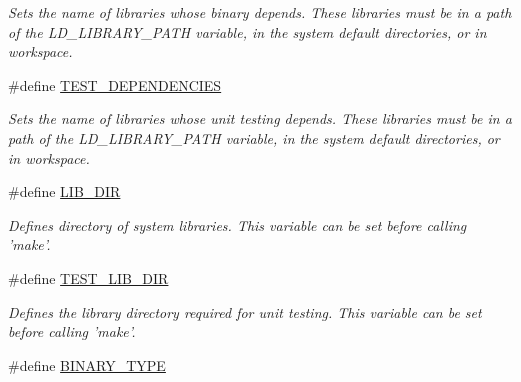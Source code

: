 \begin{DoxyCompactItemize}
\begin{DoxyCompactList}\small\item\em Sets the name of libraries whose binary depends. These libraries must be in a path of the L\+D\+\_\+\+L\+I\+B\+R\+A\+R\+Y\+\_\+\+P\+A\+T\+H variable, in the system default directories, or in workspace. \end{DoxyCompactList}\item 
\hypertarget{group___project___variables_ga36eaa1244b8f912226a6211c0300afd1}{\#define \hyperlink{group___project___variables_ga36eaa1244b8f912226a6211c0300afd1}{T\+E\+S\+T\+\_\+\+D\+E\+P\+E\+N\+D\+E\+N\+C\+I\+E\+S}}\label{group___project___variables_ga36eaa1244b8f912226a6211c0300afd1}

\begin{DoxyCompactList}\small\item\em Sets the name of libraries whose unit testing depends. These libraries must be in a path of the L\+D\+\_\+\+L\+I\+B\+R\+A\+R\+Y\+\_\+\+P\+A\+T\+H variable, in the system default directories, or in workspace. \end{DoxyCompactList}\item 
\hypertarget{group___project___variables_ga84125bd283e4810d75a8be644b522672}{\#define \hyperlink{group___project___variables_ga84125bd283e4810d75a8be644b522672}{L\+I\+B\+\_\+\+D\+I\+R}}\label{group___project___variables_ga84125bd283e4810d75a8be644b522672}

\begin{DoxyCompactList}\small\item\em Defines directory of system libraries. This variable can be set before calling 'make'. \end{DoxyCompactList}\item 
\hypertarget{group___project___variables_gaff7229fc1fa8b5497265124671da29b2}{\#define \hyperlink{group___project___variables_gaff7229fc1fa8b5497265124671da29b2}{T\+E\+S\+T\+\_\+\+L\+I\+B\+\_\+\+D\+I\+R}}\label{group___project___variables_gaff7229fc1fa8b5497265124671da29b2}

\begin{DoxyCompactList}\small\item\em Defines the library directory required for unit testing. This variable can be set before calling 'make'. \end{DoxyCompactList}\item 
\hypertarget{group___project___variables_ga4784add1b0803628960f83525dadc73b}{\#define \hyperlink{group___project___variables_ga4784add1b0803628960f83525dadc73b}{B\+I\+N\+A\+R\+Y\+\_\+\+T\+Y\+P\+E}}\label{group___project___variables_ga4784add1b0803628960f83525dadc73b}


\end{DoxyCompactItemize}
